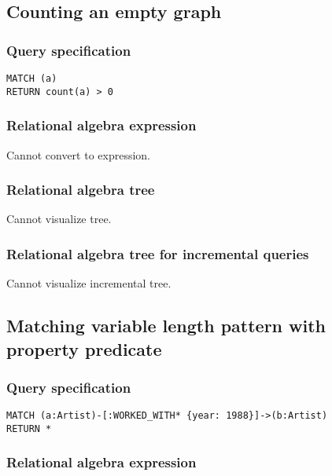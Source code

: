 \subsection{Counting an empty graph}

\subsubsection*{Query specification}

\begin{lstlisting}
MATCH (a)
RETURN count(a) > 0
\end{lstlisting}

\subsubsection*{Relational algebra expression}

Cannot convert to expression.

\subsubsection*{Relational algebra tree}

Cannot visualize tree.

\subsubsection*{Relational algebra tree for incremental queries}

Cannot visualize incremental tree.

\subsection{Matching variable length pattern with property predicate}

\subsubsection*{Query specification}

\begin{lstlisting}
MATCH (a:Artist)-[:WORKED_WITH* {year: 1988}]->(b:Artist)
RETURN *
\end{lstlisting}

\subsubsection*{Relational algebra expression}

